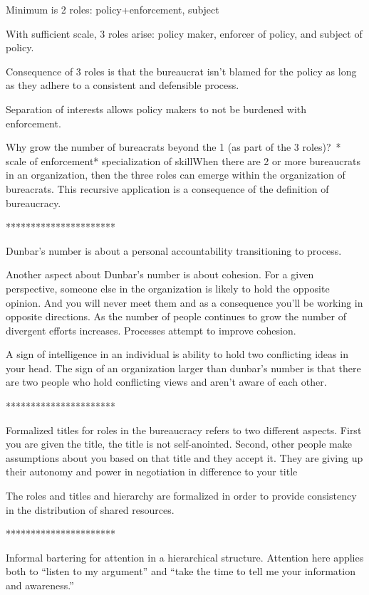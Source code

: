 Minimum is 2 roles: policy+enforcement, subject

With sufficient scale, 3 roles arise: policy maker, enforcer of policy, and subject of policy.

Consequence of 3 roles is that the bureaucrat isn't blamed for the policy as long as they adhere to a consistent and defensible process. 

Separation of interests allows policy makers to not be burdened with enforcement.

Why grow the number of bureacrats beyond the 1 (as part of the 3 roles)? * scale of enforcement* specialization of skillWhen there are 2 or more bureaucrats in an organization, then the three roles can emerge within the organization of bureacrats. This recursive application is a consequence of the definition of bureaucracy.

**********************

Dunbar's number is about a personal accountability transitioning to process.

Another aspect about Dunbar's number is about cohesion. For a given perspective, someone else in the organization is likely to hold the opposite opinion. And you will never meet them and as a consequence you'll be working in opposite directions. As the number of people continues to grow the number of divergent efforts increases. Processes attempt to improve cohesion.

A sign of intelligence in an individual is ability to hold two conflicting ideas in your head. The sign of an organization larger than dunbar's number is that there are two people who hold conflicting views and aren't aware of each other.

**********************



Formalized titles for roles in the bureaucracy refers to two different aspects.
First you are given the title, the title is not self-anointed.
Second, other people make assumptions about you based on that title and they accept it. They are giving up their autonomy and power in negotiation in difference to your title


The roles and titles and hierarchy are formalized in order to provide consistency in the distribution of shared resources.

**********************

Informal bartering for attention in a hierarchical structure. Attention here applies both to ``listen to my argument'' and ``take the time to tell me your information and awareness.''

